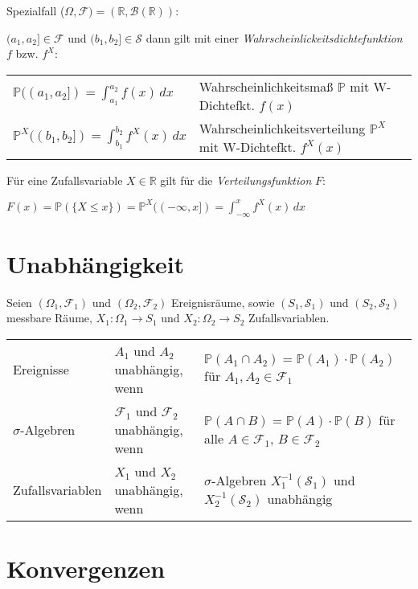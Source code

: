 \documentclass{article}
\begin{document}
Spezialfall ($\Omega,\mathcal{F}) = (\mathbb{R}, \mathcal{B}(\mathbb{R}))$:

$(a_1,a_2] \in \mathcal{F}$ und $(b_1,b_2] \in \mathcal{S}$ dann gilt mit einer \emph{Wahrscheinlickeitsdichtefunktion} $f$ bzw. $f^X$:

\begin{tabular}{ll}
$\mathbb{P}((a_1,a_2]) = \int_{a_1}^{a_2} f(x)\, dx$ & Wahrscheinlichkeitsmaß $\mathbb{P}$ mit W-Dichtefkt. $f(x)$ \\
$\mathbb{P}^X((b_1,b_2]) = \int_{b_1}^{b_2} f^X(x)\, dx$ & Wahrscheinlichkeitsverteilung $\mathbb{P}^X$ mit W-Dichtefkt. $f^X(x)$ \\
\end{tabular}

Für eine Zufallsvariable $X \in \mathbb{R}$ gilt für die \emph{Verteilungsfunktion} $F$:

$F(x) = \mathbb{P}(\{X \le x\}) = \mathbb{P}^X((-\infty,x]) = \int_{-\infty}^x f^X(x)\, dx$


\section{Unabhängigkeit}

Seien $(\Omega_1, \mathcal{F_1})$ und $(\Omega_2, \mathcal{F_2})$ Ereignisräume, sowie $(S_1, \mathcal{S_1})$ und $(S_2, \mathcal{S_2})$ messbare Räume, $X_1: \Omega_1 \longrightarrow S_1$ und $X_2: \Omega_2 \longrightarrow S_2$ Zufallsvariablen.

\begin{tabular}{lll}
Ereignisse & $A_1$ und $A_2$ unabhängig, wenn & $\mathbb{P}(A_1 \cap A_2) = \mathbb{P}(A_1) \cdot \mathbb{P}(A_2)$ für $A_1,A_2 \in \mathcal{F_1}$ \\
$\sigma$-Algebren & $\mathcal{F_1}$ und $\mathcal{F_2}$ unabhängig, wenn & $\mathbb{P}(A \cap B) = \mathbb{P}(A) \cdot \mathbb{P}(B)$ für alle $A \in \mathcal{F_1}$, $B \in \mathcal{F_2}$ \\
Zufallsvariablen & $X_1$ und $X_2$ unabhängig, wenn &  $\sigma$-Algebren $X^{-1}_1(\mathcal{S_1})$ und $X^{-1}_2(\mathcal{S_2})$ unabhängig \\
\end{tabular}

\section{Konvergenzen}
\end{document}

